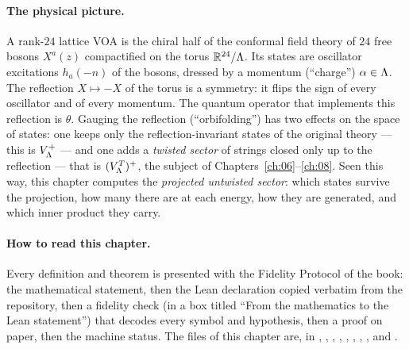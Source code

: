 \paragraph{The physical picture.} A rank-$24$ lattice VOA is the chiral half of the conformal
field theory of $24$ free bosons $X^a(z)$ compactified on the torus $\mathbb R^{24}/{\Lambda}$. Its
states are oscillator excitations $h_{a}(-n)$ of the bosons, dressed by a momentum (``charge'')
$\alpha\in{\Lambda}$. The reflection $X\mapsto -X$ of the torus is a symmetry: it flips the sign of every
oscillator and of every momentum. The quantum operator that implements this reflection is $\theta$.
Gauging the reflection (``orbifolding'') has two effects on the space of states: one keeps only the
reflection-invariant states of the original theory --- this is $V_{\Lambda}^+$ --- and one adds a
\emph{twisted sector} of strings closed only up to the reflection --- that is $(V_{\Lambda}^T)^+$,
the subject of Chapters~\ref{ch:06}--\ref{ch:08}. Seen this way, this chapter computes the
\emph{projected untwisted sector}: which states survive the projection, how many there are at
each energy, how they are generated, and which inner product they carry.

\paragraph{How to read this chapter.} Every definition and theorem is presented with the
Fidelity Protocol of the book: the mathematical statement, then the Lean declaration copied
verbatim from the repository, then a fidelity check (in a box titled ``From the mathematics to the
Lean statement'') that decodes every symbol and hypothesis, then a proof on paper, then the
machine status. The files of this chapter are, in ,
, , ,
, , ,
,  and .

